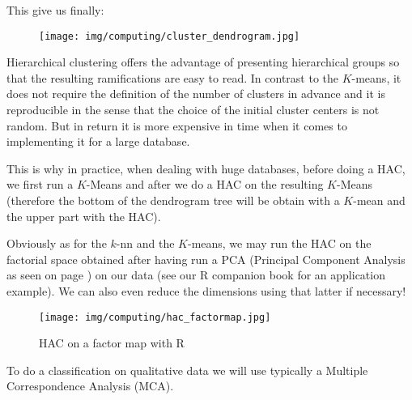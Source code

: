 	This give us finally:
	\begin{figure}[H]
		\centering
		\texttt{[image: img/computing/cluster\_dendrogram.jpg]}
	\end{figure}
	Hierarchical clustering offers the advantage of presenting hierarchical groups so that the resulting ramifications are easy to read. In contrast to the $K$-means, it does not require the definition of the number of clusters in advance and it is reproducible in the sense that the choice of the initial cluster centers is not random. But in return it is more expensive in time when it comes to implementing it for a large database.
	
	This is why in practice, when dealing with huge databases, before doing a HAC, we first run a $K$-Means and after we do a HAC on the resulting $K$-Means (therefore the bottom of the dendrogram tree will be obtain with a $K$-mean and the upper part with the HAC).
	
	 Obviously as for the $k$-nn and the $K$-means, we may run the HAC on the factorial space obtained after having run a PCA (Principal Component Analysis as seen on page \pageref{principal component analysis}) on our data (see our R companion book for an application example). We can also even reduce the dimensions using that latter if necessary!
	\begin{figure}[H]
		\centering
		\texttt{[image: img/computing/hac\_factormap.jpg]}
		\caption[HAC on a factor map]{HAC on a factor map with R}
	\end{figure}
	\begin{tcolorbox}[title=Remark,colframe=black,arc=10pt]
	To do a classification on qualitative data we will use typically a Multiple Correspondence Analysis (MCA).
	\end{tcolorbox}
	
	\pagebreak

